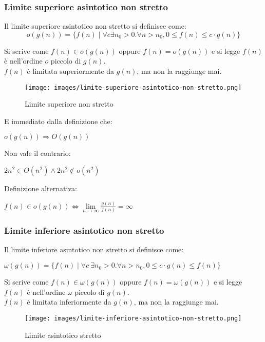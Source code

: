 \subsubsection{Limite superiore asintotico non stretto}
\begin{definition}
	Il limite superiore asintotico non stretto si definisce come:
	\begin{equation}
		o(g(n)) = \{f(n) \mid \forall c \exists n_0 > 0 . \forall n > n_0, 0 \leq f(n) \leq c \cdot g(n) \}
	\end{equation}
\end{definition}
\noindent Si scrive come $f(n) \in o(g(n))$ oppure $f(n) = o(g(n))$ e si legge $f(n)$ è nell'ordine $o$ piccolo di $g(n)$.\\
$f(n)$ è limitata superiormente da $g(n)$, ma non la raggiunge mai.\\
\begin{wrapfigure}[7]{l}{7cm}
	\vspace{-15pt}
	\centering
	\texttt{[image: images/limite-superiore-asintotico-non-stretto.png]}
	\vspace{-5pt}
	\caption{Limite superiore non stretto}
\end{wrapfigure}

\vspace{-15pt}
E immediato dalla definizione che:
\begin{center}
	$o(g(n)) \Longrightarrow O(g(n))$
\end{center}
Non vale il contrario: 
\begin{center}
	$2n^2 \in O(n^2) \land 2n^2 \notin o(n^2)$
\end{center}
Definizione alternativa:
\begin{center}
	$f(n) \in o(g(n)) \Longleftrightarrow \lim\limits_{n\to \infty}\frac{g(n)}{f(n)} = \infty$
\end{center}

\subsubsection{Limite inferiore asintotico non stretto}
\begin{definition}
	Il limite inferiore asintotico non stretto si definisce come:
	\begin{center}
		$\omega(g(n)) = \{f(n) \mid \forall c \: \exists n_0 > 0 . \forall n > n_0, 0 \leq c \cdot g(n) \leq f(n) \}$
	\end{center}
\end{definition}
\noindent Si scrive come $f(n) \in \omega(g(n))$ oppure $f(n) = \omega(g(n))$ e si legge $f(n)$ è nell'ordine $\omega$ piccolo di $g(n)$.\\
$f(n)$ è limitata inferiormente da $g(n)$, ma non la raggiunge mai.\\
\begin{wrapfigure}[7]{l}{7cm}
	\vspace{-15pt}
	\centering
	\texttt{[image: images/limite-inferiore-asintotico-non-stretto.png]}
	\vspace{-5pt}
	\caption{Limite asintotico stretto}
\end{wrapfigure}

